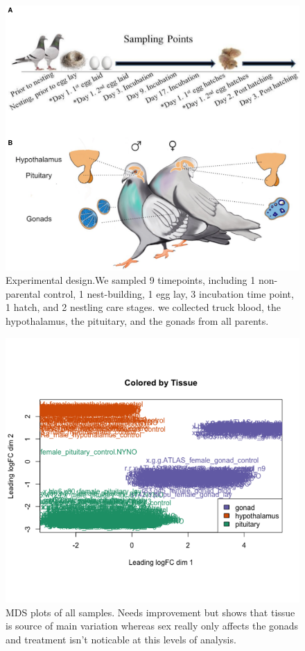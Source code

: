 \documentclass[10pt,letterpaper]{article}
\begin{document}
\begin{figure}
\centering
\includegraphics{characterization_manuscript_files/figure-latex/unnamed-chunk-2-1.pdf}
\caption{Experimental design.We sampled 9 timepoints, including 1
non-parental control, 1 nest-building, 1 egg lay, 3 incubation time
point, 1 hatch, and 2 nestling care stages. we collected truck blood,
the hypothalamus, the pituitary, and the gonads from all parents.}
\end{figure}

\begin{figure}
\centering
\includegraphics{characterization_manuscript_files/figure-latex/unnamed-chunk-3-1.pdf}
\caption{MDS plots of all samples. Needs improvement but shows that
tissue is source of main variation whereas sex really only affects the
gonads and treatment isn't noticable at this levels of analysis.}
\end{figure}
\end{document}

